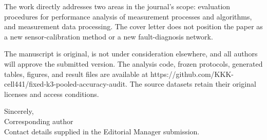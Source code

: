 \documentclass[10pt]{article}
\begin{document}
The work directly addresses two areas in the journal's scope: evaluation
procedures for performance analysis of measurement processes and algorithms,
and measurement data processing. The cover letter does not position the paper
as a new sensor-calibration method or a new fault-diagnosis network.

The manuscript is original, is not under consideration elsewhere, and all
authors will approve the submitted version. The analysis code, frozen
protocols, generated tables, figures, and result files are available at
https://github.com/KKK-cell441/fixed-k3-pooled-accuracy-audit. The source
datasets retain their original licenses and access conditions.

\vspace{0.7em}
\noindent
Sincerely,\\
Corresponding author\\
Contact details supplied in the Editorial Manager submission.
\end{document}
